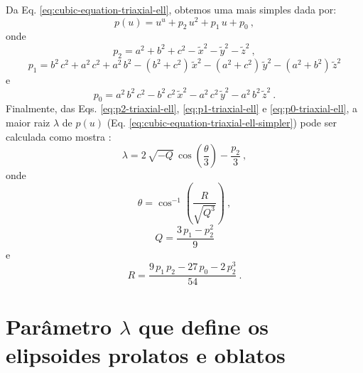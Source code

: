 Da Eq. \ref{eq:cubic-equation-triaxial-ell}, obtemos uma mais simples
dada por:
\begin{equation}
p(u) =  u^{u} + p_{2} \, u^{2} + p_{1} \, u + p_{0} \: ,
\label{eq:cubic-equation-triaxial-ell-simpler}
\end{equation}
onde
\begin{equation}
p_{2} = a^{2} + b^{2} + c^{2} - \tilde{x}^{2} - \tilde{y}^{2} - \tilde{z}^{2} \: ,
\label{eq:p2-triaxial-ell}
\end{equation}
\begin{equation}
p_{1} = b^{2} \, c^{2} + a^{2} \, c^{2} + a^{2} \, b^{2} 
- (b^{2} + c^{2}) \, \tilde{x}^{2}
- (a^{2} + c^{2}) \, \tilde{y}^{2} 
- (a^{2} + b^{2}) \, \tilde{z}^{2}
\label{eq:p1-triaxial-ell}
\end{equation}
e
\begin{equation}
p_{0} =  a^{2} \, b^{2} \, c^{2} - b^{2} \, c^{2} \, 
\tilde{x}^{2} - a^{2} \, c^{2} \, \tilde{y}^{2} - a^{2} \, 
b^{2} \, \tilde{z}^{2} \: .
\label{eq:p0-triaxial-ell}
\end{equation}
Finalmente, das Eqs. \ref{eq:p2-triaxial-ell}, 
\ref{eq:p1-triaxial-ell} e \ref{eq:p0-triaxial-ell},
a maior raiz $\lambda$ de $p(u)$ 
(Eq. \ref{eq:cubic-equation-triaxial-ell-simpler}) pode ser
calculada como mostra \citep{weisstein2017}:
\begin{equation}
\lambda = 2 \, \sqrt{-Q} \, \cos \left( \frac{\theta}{3}\right) - \frac{p_{2}}{3} \: ,
\label{eq:lambda-triaxial-ell}
\end{equation}
onde
\begin{equation}
\theta = \cos^{-1} \left( \frac{R}{\sqrt{Q^{3}}} \right) \: ,
\label{eq:theta-triaxial-ell}
\end{equation}
\begin{equation}
Q = \frac{3 \, p_{1} - p_{2}^{2}}{9}
\label{eq:Q-triaxial-ell}
\end{equation}
e
\begin{equation}
R = \frac{9 \, p_{1} \, p_{2} - 27 \, p_{0} - 2 \, p_{2}^{3}}{54} \: .
\label{eq:R-triaxial-ell}
\end{equation}

\section{Parâmetro $\lambda$ que define os elipsoides prolatos e oblatos}

